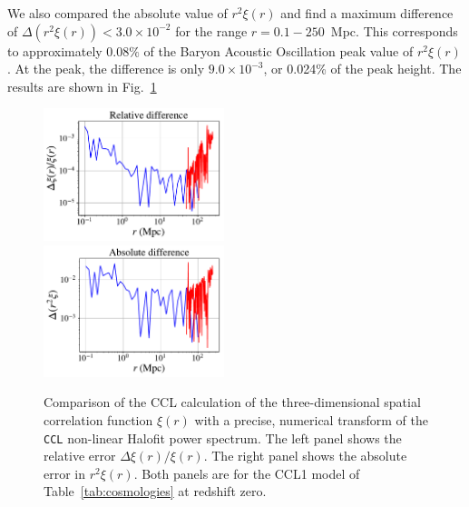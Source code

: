 \documentclass[\docopts]{\docclass}
\newcommand{\ccl}{{\tt CCL}\xspace}
\begin{document}
We also compared the absolute value of $r^2 \xi(r)$ and find a maximum difference of $\Delta (r^2 \xi(r)) < 3.0 \times 10^{-2}$ for the range $r = 0.1 - 250$~Mpc. This corresponds to approximately $0.08\%$ of the Baryon Acoustic Oscillation peak value of $r^2 \xi(r)$. At the peak, the difference is only $9.0 \times 10^{-3}$, or 0.024\% of the peak height. The results are shown in Fig.~\ref{fig:benchmark_xi}
%
\begin{figure}
\centering
\includegraphics[width=0.47\textwidth]{benchmark_xi_rel} ~~~
\includegraphics[width=0.47\textwidth]{benchmark_xi_abs} 
\caption{Comparison of the CCL calculation of the three-dimensional spatial correlation function $\xi(r)$ with a precise, numerical transform of the \ccl non-linear Halofit power spectrum. The left panel shows the relative error $\Delta \xi(r) / \xi(r)$. The right panel shows the absolute error in $r^2 \xi(r)$. Both panels are for the CCL1 model of Table~\ref{tab:cosmologies} at redshift zero.}
\label{fig:benchmark_xi}
\end{figure}
%
\end{document}
